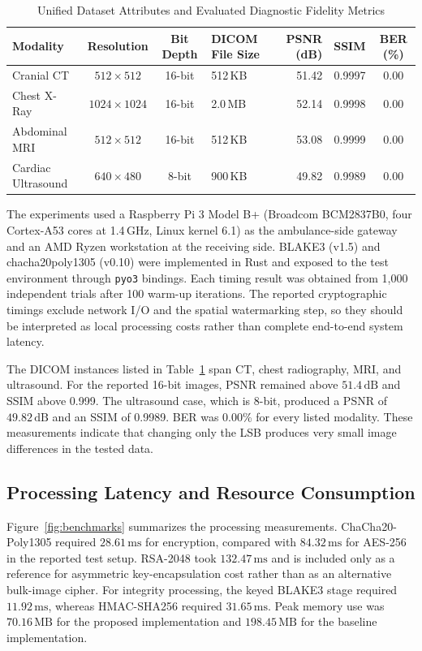 \documentclass[runningheads]{llncs}
\begin{document}
\begin{table}[t]
\centering
\caption{Unified Dataset Attributes and Evaluated Diagnostic Fidelity Metrics}
\label{tab:dataset_fidelity}
\small
\begin{tabular}{@{}lcclrrc@{}}
\toprule
Modality & Resolution & Bit Depth & DICOM File Size & PSNR (dB) & SSIM & BER (\%) \\
\midrule
Cranial CT         & $512 \times 512$   & 16-bit & 512\,KB & 51.42 & 0.9997 & 0.00 \\
Chest X-Ray        & $1024 \times 1024$ & 16-bit & 2.0\,MB & 52.14 & 0.9998 & 0.00 \\
Abdominal MRI      & $512 \times 512$   & 16-bit & 512\,KB & 53.08 & 0.9999 & 0.00 \\
Cardiac Ultrasound & $640 \times 480$   & 8-bit  & 900\,KB & 49.82 & 0.9989 & 0.00 \\
\bottomrule
\end{tabular}
\end{table}

The experiments used a Raspberry Pi 3 Model B+ (Broadcom BCM2837B0, four Cortex-A53 cores at 1.4\,GHz, Linux kernel 6.1) as the ambulance-side gateway and an AMD Ryzen workstation at the receiving side. BLAKE3 (v1.5) and chacha20poly1305 (v0.10) were implemented in Rust and exposed to the test environment through \texttt{pyo3} bindings. Each timing result was obtained from 1{,}000 independent trials after 100 warm-up iterations. The reported cryptographic timings exclude network I/O and the spatial watermarking step, so they should be interpreted as local processing costs rather than complete end-to-end system latency.

The DICOM instances listed in Table~\ref{tab:dataset_fidelity} span CT, chest radiography, MRI, and ultrasound. For the reported 16-bit images, PSNR remained above $51.4\,\text{dB}$ and SSIM above 0.999. The ultrasound case, which is 8-bit, produced a PSNR of $49.82\,\text{dB}$ and an SSIM of 0.9989. BER was 0.00\% for every listed modality. These measurements indicate that changing only the LSB produces very small image differences in the tested data.

\subsection{Processing Latency and Resource Consumption}
Figure~\ref{fig:benchmarks} summarizes the processing measurements. ChaCha20-Poly1305 required $28.61\,\text{ms}$ for encryption, compared with $84.32\,\text{ms}$ for AES-256 in the reported test setup. RSA-2048 took $132.47\,\text{ms}$ and is included only as a reference for asymmetric key-encapsulation cost rather than as an alternative bulk-image cipher. For integrity processing, the keyed BLAKE3 stage required $11.92\,\text{ms}$, whereas HMAC-SHA256 required $31.65\,\text{ms}$. Peak memory use was $70.16\,\text{MB}$ for the proposed implementation and $198.45\,\text{MB}$ for the baseline implementation.
\end{document}
